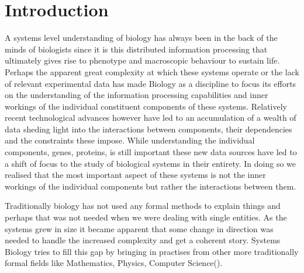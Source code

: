 

\chapter{Introduction}  %

\ifpdf
    \graphicspath{{Chapter1/Figs/Raster/}{Chapter1/Figs/PDF/}{Chapter1/Figs/}}
\else
    \graphicspath{{Chapter1/Figs/Vector/}{Chapter1/Figs/}}
\fi


A systems level understanding of biology has always been in the back
of the minds of biologists since it is this distributed information
processing that ultimately gives rise to phenotype and macroscopic
behaviour to sustain life. Perhaps the apparent great complexity at
which these systems operate or the lack of relevant experimental data
has made Biology as a discipline to focus its efforts on the
understanding of the information processing capabilities and inner
workings of the individual constituent components of these
systems. Relatively recent technological advances however have led to
an accumulation of a wealth of data sheding light into the interactions
between components, their dependencies and the constraints these
impose. While understanding the individual components, genes,
proteins, is still important these new data sources have led to a shift
of focus to the study of biological systems in their entirety. In
doing so we realised that the most important aspect of these systems
is not the inner workings of the individual components but rather the
interactions between them.

Traditionally biology has not used any formal methods to explain
things and perhaps that was not needed when we were dealing with
single entities. As the systems grew in size it became apparent that
some change in direction was needed to handle the increased complexity
and get a coherent story. Systems Biology tries to fill this gap by
bringing in practises from other more traditionally formal fields like
Mathematics, Physics, Computer Science(\citet{kitano2002systems, ideker2001new}).

